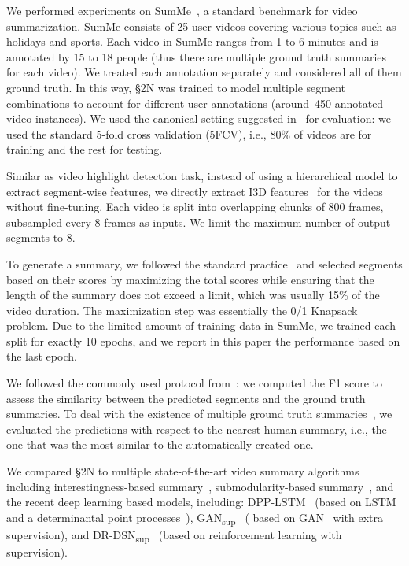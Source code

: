 \documentclass[10pt,journal,compsoc]{IEEEtran}
\begin{document}
 We performed experiments on SumMe~\cite{gygli2014creating}, a standard benchmark for video summarization. SumMe consists of 25 user videos covering various topics such as holidays and sports. Each video in SumMe ranges from 1 to 6 minutes and is annotated by 15 to 18 people (thus there are multiple ground truth summaries for each video). We treated each annotation separately and considered all of them ground truth. In this way, \S2N was trained to model multiple segment combinations to account for different user annotations (around~450 annotated video instances). We used the  canonical setting suggested in~\cite{zhang2016video} for evaluation: we used the standard 5-fold cross validation (5FCV), i.e., 80\% of videos are for training and the rest for testing.


 Similar as video highlight detection task, instead of using a hierarchical model to extract segment-wise features, we directly extract I3D features~\cite{carreira2017quo} for the videos without fine-tuning.  Each video is split into overlapping chunks of 800 frames, subsampled every 8 frames as inputs. We limit the maximum number of output segments to 8. 

To generate a summary, we followed the standard practice~\cite{zhang2016video, zhou2017deep} and 
selected segments based on their scores by maximizing the total scores while ensuring that the length of the summary does not exceed a limit, which was usually 15\% of the video duration. The maximization step was essentially the 0/1 Knapsack problem. Due to the limited amount of training data in SumMe, we trained each split for exactly 10 epochs, and we report in this paper the performance based on the last epoch. 


 We followed the commonly used protocol from~\cite{zhang2016video,zhou2017deep,gygli2015video}: we computed the F1 score to assess the similarity between the predicted segments and the ground truth summaries. To deal with the existence of multiple ground truth summaries~\cite{gygli2015video}, we evaluated the predictions with respect to the nearest human summary, i.e., the one that was the most similar to the automatically created one. 



 We compared \S2N to multiple state-of-the-art video summary algorithms including interestingness-based summary~\cite{gygli2014creating}, submodularity-based summary~\cite{gygli2015video}, and the recent deep learning based models,  including:  DPP-LSTM~\cite{zhang2016video} (based on LSTM and a determinantal point processes~\cite{gong2014diverse}), GAN\textsubscript{sup}~\cite{mahasseni2017unsupervised} ( based on GAN~\cite{goodfellow2014generative} with extra supervision),  and DR-DSN\textsubscript{sup}~\cite{zhou2017deep} (based on reinforcement learning with supervision). 
\end{document}
